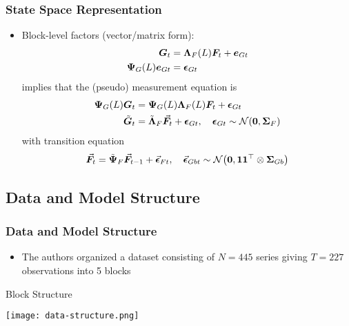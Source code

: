 \documentclass[10pt, compress, notheorems, aspectratio=169]{beamer}
\let\originalleft\left
\let\originalright\right
\renewcommand{\left}{\mathopen{}\mathclose \bgroup \originalleft}
\renewcommand{\right}{\aftergroup \egroup \originalright}
\begin{document}
\begin{frame}
	\frametitle{State Space Representation}
	\begin{itemize}
		\item Block-level factors (vector/matrix form):
			\begin{align*}
				{\bm G}_{t} &= {\bm \Lambda}_{F} \left( L \right) {\bm F}_{t} + {\bm e}_{Gt} \\
				{\bm \Psi}_{G} (L) {\bm e}_{Gt} &= {\bm \epsilon}_{Gt}
			\end{align*}
			implies that the (pseudo) measurement equation is
			\begin{equation}
				\begin{aligned}
					{\bm \Psi}_{G} (L) {\bm G}_{t} &= {\bm \Psi}_{G} (L) {\bm \Lambda}_{F} \left( L \right) {\bm F}_{t} + {\bm \epsilon}_{Gt} \\
					\tilde{\bm G}_{t} &= \tilde{\bm \Lambda}_{F} \vec{\bm F}_{t} + {\bm \epsilon}_{Gt}, \quad {\bm \epsilon}_{Gt} \sim \mathcal{N} \left( {\bf 0}, {\bm \Sigma}_{F} \right)
				\end{aligned}
			\end{equation}
			with transition equation
			\begin{equation}
				\vec{\bm F}_{t} = \tilde{\bm \Psi}_{F} \vec{\bm F}_{t-1} + \vec{\bm \epsilon}_{Ft}, \quad \vec{\bm \epsilon}_{Gbt} \sim \mathcal{N} \left( {\bf 0}, {\bf 1} {\bf 1}^{\top} \otimes {\bm \Sigma}_{Gb} \right)
			\end{equation}
	\end{itemize}
\end{frame}

\subsection{Data and Model Structure}
\begin{frame}
	\frametitle{Data and Model Structure}
	\begin{itemize}
		\item The authors organized a dataset consisting of $N=445$ series giving $T=227$ observations into 5 blocks	
	\end{itemize}
	\begin{table}[ht]
		\centering
		\caption{Block Structure}
		\texttt{[image: data-structure.png]}
	\end{table}
\end{frame}
\end{document}
